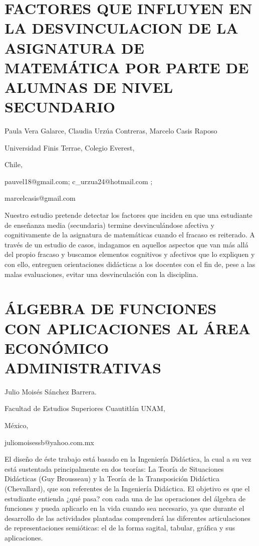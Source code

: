 \section{FACTORES QUE INFLUYEN EN LA DESVINCULACION DE LA ASIGNATURA DE MATEMÁTICA
POR PARTE DE ALUMNAS DE NIVEL SECUNDARIO }

\begin{datos}

Paula Vera Galarce, Claudia Urzúa Contreras, Marcelo Casis Raposo

Universidad Finis Terrae, Colegio Everest,

Chile,

pauvel18@gmail.com; c\_urzua24@hotmail.com ;

marcelcasis@gmail.com 

\end{datos}

Nuestro estudio pretende detectar los factores que inciden en que
una estudiante de enseñanza media (secundaria) termine desvinculándose
afectiva y cognitivamente de la asignatura de matemáticas cuando el
fracaso es reiterado. A través de un estudio de casos, indagamos en
aquellos aspectos que van más allá del propio fracaso y buscamos elementos
cognitivos y afectivos que lo expliquen y con ello, entreguen orientaciones
didácticas a los docentes con el fin de, pese a las malas evaluaciones,
evitar una desvinculación con la disciplina. 





\section{ÁLGEBRA DE FUNCIONES CON APLICACIONES AL ÁREA ECONÓMICO ADMINISTRATIVAS}

\begin{datos}

Julio Moisés Sánchez Barrera.

Facultad de Estudios Superiores Cuautitlán UNAM,

México,

juliomoisessb@yahoo.com.mx 

\end{datos}

El diseño de éste trabajo está basado en la Ingeniería Didáctica,
la cual a su vez está sustentada principalmente en dos teorías: La
Teoría de Situaciones Didácticas (Guy Brousseau) y la Teoría de la
Transposición Didáctica (Chevallard), que son referentes de la Ingeniería
Didáctica. El objetivo es que el estudiante entienda ¿qué pasa? con
cada una de las operaciones del álgebra de funciones y pueda aplicarlo
en la vida cuando sea necesario, ya que durante el desarrollo de las
actividades plantadas comprenderá las diferentes articulaciones de
representaciones semióticas: el de la forma sagital, tabular, gráfica
y sus aplicaciones. 


